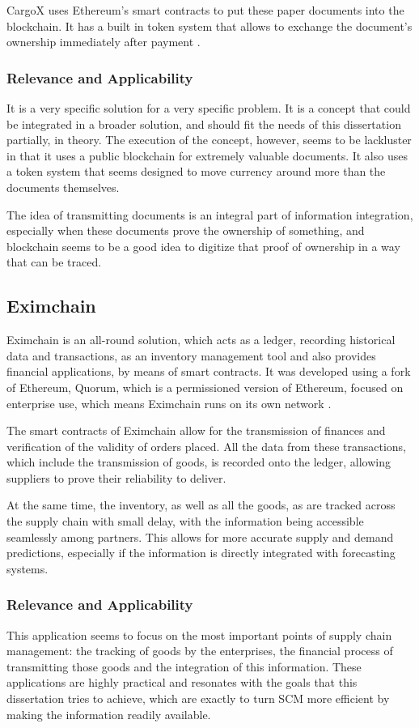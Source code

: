 CargoX uses Ethereum's smart contracts to put these paper documents into the blockchain. It has a built in token system that allows to exchange the document's ownership immediately after payment \cite{CargoX2017}.

\subsubsection{Relevance and Applicability}
It is a very specific solution for a very specific problem. It is a concept that could be integrated in a broader solution, and should fit the needs of this dissertation partially, in theory. The execution of the concept, however, seems to be lackluster in that it uses a public blockchain for extremely valuable documents. It also uses a token system that seems designed to move currency around more than the documents themselves.

The idea of transmitting documents is an integral part of information integration, especially when these documents prove the ownership of something, and blockchain seems to be a good idea to digitize that proof of ownership in a way that can be traced.

\subsection{Eximchain}
Eximchain is an all-round solution, which acts as a ledger, recording historical data and transactions, as an inventory management tool and also provides financial applications, by means of smart contracts. It was developed using a fork of Ethereum, Quorum, which is a permissioned version of Ethereum, focused on enterprise use, which means Eximchain runs on its own network \cite{Huertas2017}.


The smart contracts of Eximchain allow for the transmission of finances and verification of the validity of orders placed. All the data from these transactions, which include the transmission of goods, is recorded onto the ledger, allowing suppliers to prove their reliability to deliver. 


At the same time, the inventory, as well as all the goods, as are tracked across the supply chain with small delay, with the information being accessible seamlessly among partners. This allows for more accurate supply and demand predictions, especially if the information is directly integrated with forecasting systems.

\subsubsection{Relevance and Applicability}
This application seems to focus on the most important points of supply chain management: the tracking of goods by the enterprises, the financial process of transmitting those goods and the integration of this information. These applications are highly practical and resonates with the goals that this dissertation tries to achieve, which are exactly to turn SCM more efficient by making the information readily available.

